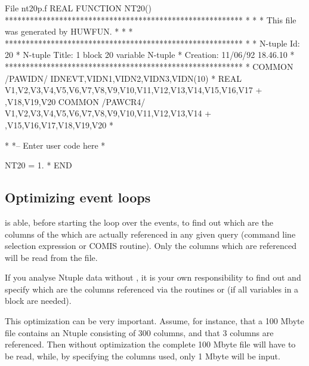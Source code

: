 \begin{XMPt}{File nt20p.f}
      REAL FUNCTION NT20()
*********************************************************
*                                                       *
* This file was generated by HUWFUN.                    *
*                                                       *
*********************************************************
*
*     N-tuple Id:     20
*     N-tuple Title:  1 block 20 variable N-tuple
*     Creation:       11/06/92 18.46.10
*
*********************************************************
*
      COMMON /PAWIDN/ IDNEVT,VIDN1,VIDN2,VIDN3,VIDN(10)
*
      REAL V1,V2,V3,V4,V5,V6,V7,V8,V9,V10,V11,V12,V13,V14,V15,V16,V17
     + ,V18,V19,V20
      COMMON /PAWCR4/ V1,V2,V3,V4,V5,V6,V7,V8,V9,V10,V11,V12,V13,V14
     + ,V15,V16,V17,V18,V19,V20
*

*
*--   Enter user code here
*

      NT20 = 1.
*
      END
\end{XMPt}

\subsection{Optimizing event loops}

\PAW{} is able, before starting the loop over the events, to find out
which are the columns of the \CWN{} which are actually referenced
in any given query (command line selection expression or COMIS routine).
Only the columns which are referenced will be read from the file.

If you  analyse Ntuple data without \PAW{}, it is your own
responsibility to find out and specify which are the columns
referenced via the routines  or  (if all variables
in a block are needed).

This optimization can be very important.
Assume, for instance, that a
100 Mbyte file contains an Ntuple consisting of
300 columns, and that 3 columns are referenced.
Then without optimization
the complete 100 Mbyte file will have to be read, while, by specifying
the columns used, only 1 Mbyte will be input.

